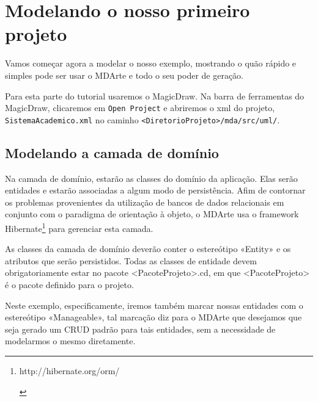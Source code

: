 \begin{framed}
	
\end{framed}

\section{Modelando o nosso primeiro projeto}

Vamos começar agora a modelar o nosso exemplo, mostrando o quão rápido e simples
pode ser usar o MDArte e todo o seu poder de geração.

Para esta parte do tutorial usaremos o MagicDraw. Na barra de ferramentas do
MagicDraw, clicaremos em \texttt{Open Project} e abriremos o xml do projeto,
\texttt{SistemaAcademico.xml} no caminho
\texttt{<DiretorioProjeto>/mda/src/uml/}.

\subsection{Modelando a camada de domínio}
Na camada de domínio, estarão as classes do domínio da aplicação. Elas serão
entidades e estarão associadas a algum modo de persistência. Afim de
contornar os problemas provenientes da utilização de bancos de dados relacionais
em conjunto com o paradigma de orientação à objeto, o MDArte usa o framework
Hibernate\footnote{\hypertarget{http://hibernate.org/orm/}{http://hibernate.org/orm/}}
para gerenciar esta camada.

As classes da camada de domínio deverão conter o estereótipo «Entity» e os
atributos que serão persistidos. Todas as classes de entidade devem
obrigatoriamente estar no pacote <PacoteProjeto>.cd, em que <PacoteProjeto> é o
pacote definido para o projeto.

Neste exemplo, especificamente, iremos também marcar nossas entidades com o
estereótipo «Manageable», tal marcação diz para o MDArte que desejamos que seja
gerado um CRUD padrão para tais entidades, sem a necessidade de modelarmos o
mesmo diretamente.

